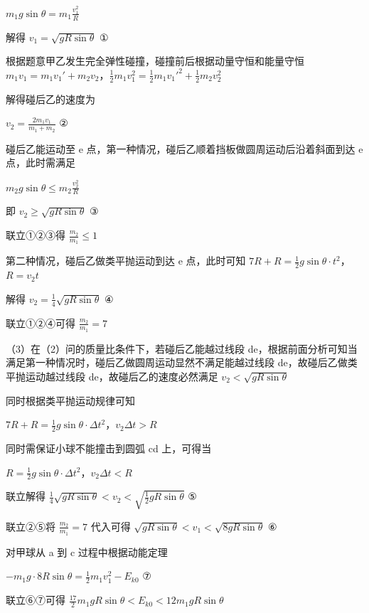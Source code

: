 \documentclass[\gkver]{gaokaozhenti}
\begin{document}
\begin{enumerate}
{$m_{1}g\sin\theta = m_{1}\frac{v_{1}^{2}}{R}$

解得 $v_{1} = \sqrt{gR\sin\theta}$ ①

根据题意甲乙发生完全弹性碰撞，碰撞前后根据动量守恒和能量守恒 $m_{1}v_{1} = m_{1}v_{1}' + m_{2}v_{2}$，$\frac{1}{2}m_{1}v_{1}^{2} = \frac{1}{2}m_{1}v_{1}'^{2} + \frac{1}{2}m_{2}v_{2}^{2}$

解得碰后乙的速度为

$v_{2} = \frac{2m_{1}v_{1}}{m_{1} + m_{2}}$ ②

碰后乙能运动至 e 点，第一种情况，碰后乙顺着挡板做圆周运动后沿着斜面到达 e 点，此时需满足

$m_{2}g\sin\theta \leq m_{2}\frac{v_{2}^{2}}{R}$

即 $v_{2} \geq \sqrt{gR\sin\theta}$ ③

联立①②③得 $\frac{m_{2}}{m_{1}} \leq 1$

第二种情况，碰后乙做类平抛运动到达 e 点，此时可知 $7R + R = \frac{1}{2}g\sin\theta\cdot t^{2}$，$R = v_{2}t$

解得 $v_{2} = \frac{1}{4}\sqrt{gR\sin\theta}$ ④

联立①②④可得 $\frac{m_{2}}{m_{1}} = 7$

（3）在（2）问的质量比条件下，若碰后乙能越过线段 de，根据前面分析可知当满足第一种情况时，碰后乙做圆周运动显然不满足能越过线段 de，故碰后乙做类平抛运动越过线段 de，故碰后乙的速度必然满足 $v_{2} < \sqrt{gR\sin\theta}$

同时根据类平抛运动规律可知

$7R + R = \frac{1}{2}g\sin\theta\cdot\Delta t^{2}$，$v_{2}\Delta t > R$

同时需保证小球不能撞击到圆弧 cd 上，可得当

$R = \frac{1}{2}g\sin\theta\cdot\Delta t^{2}$，$v_{2}\Delta t < R$

联立解得 $\frac{1}{4}\sqrt{gR\sin\theta} < v_{2} < \sqrt{\frac{1}{2}gR\sin\theta}$ ⑤

联立②⑤将 $\frac{m_{2}}{m_{1}} = 7$ 代入可得 $\sqrt{gR\sin\theta} < v_{1} < \sqrt{8gR\sin\theta}$ ⑥

对甲球从 a 到 c 过程中根据动能定理

$-m_{1}g\cdot 8R\sin\theta = \frac{1}{2}m_{1}v_{1}^{2} - E_{k0}$ ⑦

联立⑥⑦可得 $\frac{17}{2}m_{1}gR\sin\theta < E_{k0} < 12m_{1}gR\sin\theta$
}

\end{enumerate}
\end{document}
